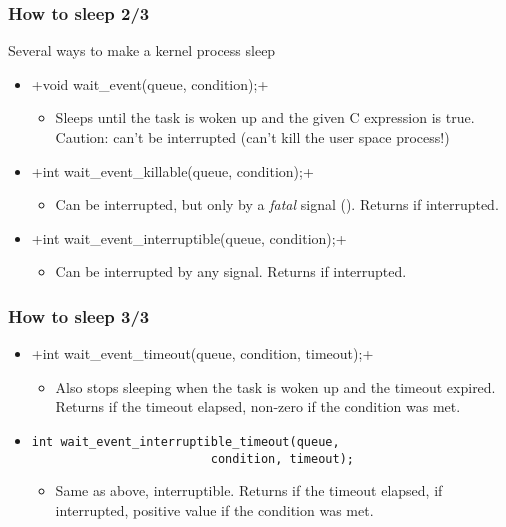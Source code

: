 \begin{frame}[fragile]
  \frametitle{How to sleep 2/3}
  Several ways to make a kernel process sleep
  \begin{itemize}
  \item {}+void wait_event(queue, condition);+
    \begin{itemize}
    \item Sleeps until the task is woken up and the given C
      expression is true. Caution: can't be interrupted (can't kill
      the user space process!)
    \end{itemize}
  \item {}+int wait_event_killable(queue, condition);+
    \begin{itemize}
    \item Can be interrupted, but only by a \emph{fatal} signal
      (). Returns \code{-} if interrupted.
    \end{itemize}
  \item {}+int wait_event_interruptible(queue, condition);+
    \begin{itemize}
    \item Can be interrupted by any signal. Returns
      \code{-} if interrupted.
    \end{itemize}
  \end{itemize}
\end{frame}

\begin{frame}[fragile]
  \frametitle{How to sleep 3/3}
  \begin{itemize}
  \item {}+int wait_event_timeout(queue, condition, timeout);+
    \begin{itemize}
    \item Also stops sleeping when the task is woken up and the
      timeout expired. Returns  if the timeout elapsed, non-zero if
      the condition was met.
    \end{itemize}
  \item \begin{verbatim}
int wait_event_interruptible_timeout(queue,
                         condition, timeout);
  \end{verbatim}
    \begin{itemize}
    \item Same as above, interruptible. Returns  if the timeout
      elapsed, \code{-} if interrupted, positive value if
      the condition was met.
    \end{itemize}
  \end{itemize}
\end{frame}

